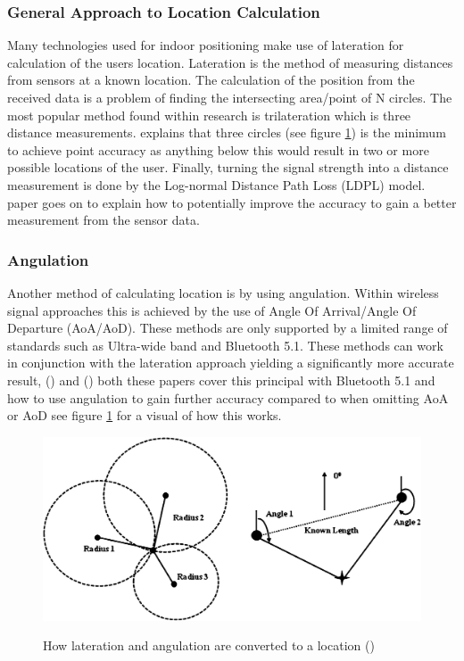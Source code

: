 \subsubsection{General Approach to Location Calculation}\label{sec:generalapprop}
Many technologies used for indoor positioning make use of lateration for calculation of the users location. Lateration is the method of measuring distances from sensors at a known location. The calculation of the position from the received data is a problem of finding the intersecting area/point of N circles. The most popular method found within research is trilateration which is three distance measurements. \cite{shchekotov_2015_indoor} explains that three circles (see figure \ref{fig:latandang}) is the minimum to achieve point accuracy as anything below this would result in two or more possible locations of the user. Finally, turning the signal strength into a distance measurement is done by the Log-normal Distance Path Loss (LDPL) model. \cite{yang_2018_an} paper goes on to explain how to potentially improve the accuracy to gain a better measurement from the sensor data.
 
\subsubsection{Angulation}
Another method of calculating location is by using angulation. Within wireless signal approaches this is achieved by the use of Angle Of Arrival/Angle Of Departure (AoA/AoD). These methods are only supported by a limited range of standards such as Ultra-wide band and Bluetooth 5.1. These methods can work in conjunction with the lateration approach yielding a significantly more accurate result, (\cite{mysticmedia_2020_the}) and (\cite{lehtimki_bluetooth}) both these papers cover this principal with Bluetooth 5.1 and how to use angulation to gain further accuracy compared to when omitting AoA or AoD see figure \ref{fig:latandang} for a visual of how this works.

\begin{figure}[h]
	\includegraphics[width=\linewidth]{images/research/distanceandaoa.png}\\
	\caption{How lateration and angulation are converted to a location (\cite{kim_2013_rfidbased})}
	\label{fig:latandang}
\end{figure}


